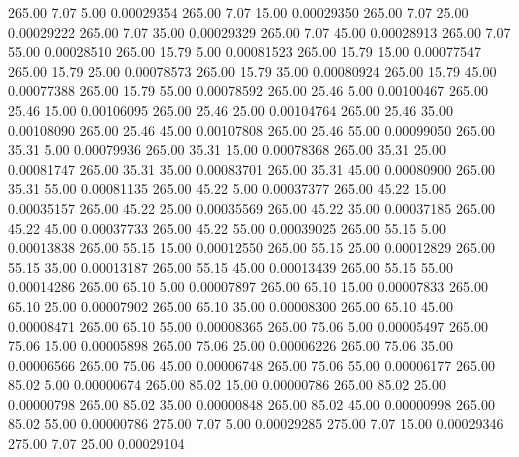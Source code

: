     265.00      7.07      5.00     0.00029354
    265.00      7.07     15.00     0.00029350
    265.00      7.07     25.00     0.00029222
    265.00      7.07     35.00     0.00029329
    265.00      7.07     45.00     0.00028913
    265.00      7.07     55.00     0.00028510
    265.00     15.79      5.00     0.00081523
    265.00     15.79     15.00     0.00077547
    265.00     15.79     25.00     0.00078573
    265.00     15.79     35.00     0.00080924
    265.00     15.79     45.00     0.00077388
    265.00     15.79     55.00     0.00078592
    265.00     25.46      5.00     0.00100467
    265.00     25.46     15.00     0.00106095
    265.00     25.46     25.00     0.00104764
    265.00     25.46     35.00     0.00108090
    265.00     25.46     45.00     0.00107808
    265.00     25.46     55.00     0.00099050
    265.00     35.31      5.00     0.00079936
    265.00     35.31     15.00     0.00078368
    265.00     35.31     25.00     0.00081747
    265.00     35.31     35.00     0.00083701
    265.00     35.31     45.00     0.00080900
    265.00     35.31     55.00     0.00081135
    265.00     45.22      5.00     0.00037377
    265.00     45.22     15.00     0.00035157
    265.00     45.22     25.00     0.00035569
    265.00     45.22     35.00     0.00037185
    265.00     45.22     45.00     0.00037733
    265.00     45.22     55.00     0.00039025
    265.00     55.15      5.00     0.00013838
    265.00     55.15     15.00     0.00012550
    265.00     55.15     25.00     0.00012829
    265.00     55.15     35.00     0.00013187
    265.00     55.15     45.00     0.00013439
    265.00     55.15     55.00     0.00014286
    265.00     65.10      5.00     0.00007897
    265.00     65.10     15.00     0.00007833
    265.00     65.10     25.00     0.00007902
    265.00     65.10     35.00     0.00008300
    265.00     65.10     45.00     0.00008471
    265.00     65.10     55.00     0.00008365
    265.00     75.06      5.00     0.00005497
    265.00     75.06     15.00     0.00005898
    265.00     75.06     25.00     0.00006226
    265.00     75.06     35.00     0.00006566
    265.00     75.06     45.00     0.00006748
    265.00     75.06     55.00     0.00006177
    265.00     85.02      5.00     0.00000674
    265.00     85.02     15.00     0.00000786
    265.00     85.02     25.00     0.00000798
    265.00     85.02     35.00     0.00000848
    265.00     85.02     45.00     0.00000998
    265.00     85.02     55.00     0.00000786
    275.00      7.07      5.00     0.00029285
    275.00      7.07     15.00     0.00029346
    275.00      7.07     25.00     0.00029104
